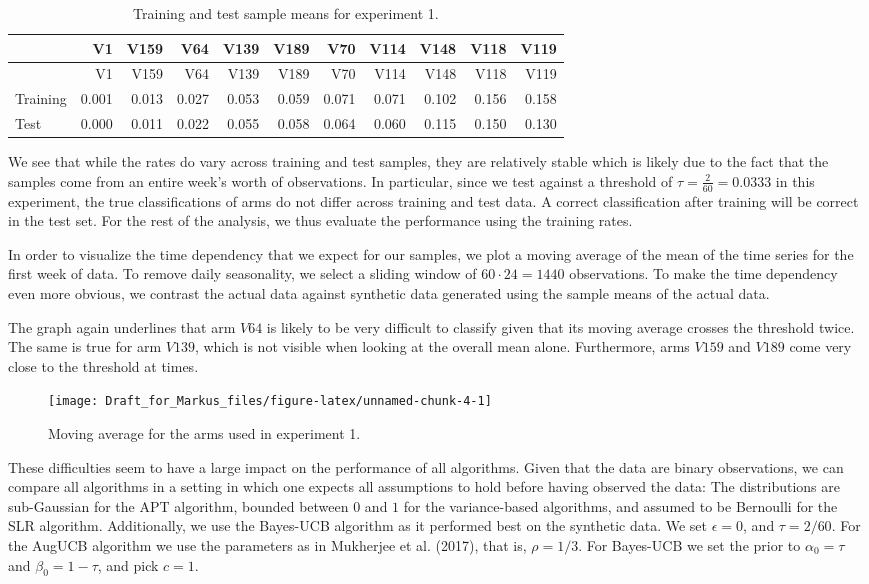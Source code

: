 \documentclass[11pt,]{article}
\begin{document}
\begin{longtable}[]{@{}lrrrrrrrrrr@{}}
\caption{Training and test sample means for experiment
1.}\tabularnewline
\toprule
& V1 & V159 & V64 & V139 & V189 & V70 & V114 & V148 & V118 &
V119\tabularnewline
\midrule
\endfirsthead
\toprule
& V1 & V159 & V64 & V139 & V189 & V70 & V114 & V148 & V118 &
V119\tabularnewline
\midrule
\endhead
Training & 0.001 & 0.013 & 0.027 & 0.053 & 0.059 & 0.071 & 0.071 & 0.102
& 0.156 & 0.158\tabularnewline
Test & 0.000 & 0.011 & 0.022 & 0.055 & 0.058 & 0.064 & 0.060 & 0.115 &
0.150 & 0.130\tabularnewline
\bottomrule
\end{longtable}

We see that while the rates do vary across training and test samples,
they are relatively stable which is likely due to the fact that the
samples come from an entire week's worth of observations. In particular,
since we test against a threshold of \(\tau = \frac{2}{60} = 0.0333\) in
this experiment, the true classifications of arms do not differ across
training and test data. A correct classification after training will be
correct in the test set. For the rest of the analysis, we thus evaluate
the performance using the training rates.

In order to visualize the time dependency that we expect for our
samples, we plot a moving average of the mean of the time series for the
first week of data. To remove daily seasonality, we select a sliding
window of \(60\cdot24 = 1440\) observations. To make the time dependency
even more obvious, we contrast the actual data against synthetic data
generated using the sample means of the actual data.

The graph again underlines that arm \(V64\) is likely to be very
difficult to classify given that its moving average crosses the
threshold twice. The same is true for arm \(V139\), which is not visible
when looking at the overall mean alone. Furthermore, arms \(V159\) and
\(V189\) come very close to the threshold at times.

\begin{figure}

{\centering \texttt{[image: Draft\_for\_Markus\_files/figure-latex/unnamed-chunk-4-1]} 

}

\caption{Moving average for the arms used in experiment 1.}\label{fig:unnamed-chunk-4}
\end{figure}

These difficulties seem to have a large impact on the performance of all
algorithms. Given that the data are binary observations, we can compare
all algorithms in a setting in which one expects all assumptions to hold
before having observed the data: The distributions are sub-Gaussian for
the APT algorithm, bounded between \(0\) and \(1\) for the
variance-based algorithms, and assumed to be Bernoulli for the SLR
algorithm. Additionally, we use the Bayes-UCB algorithm as it performed
best on the synthetic data. We set \(\epsilon = 0\), and
\(\tau = 2/60\). For the AugUCB algorithm we use the parameters as in
Mukherjee et al. (2017), that is, \(\rho = 1/3\). For Bayes-UCB we set
the prior to \(\alpha_0 = \tau\) and \(\beta_0 = 1-\tau\), and pick
\(c=1\).
\end{document}

